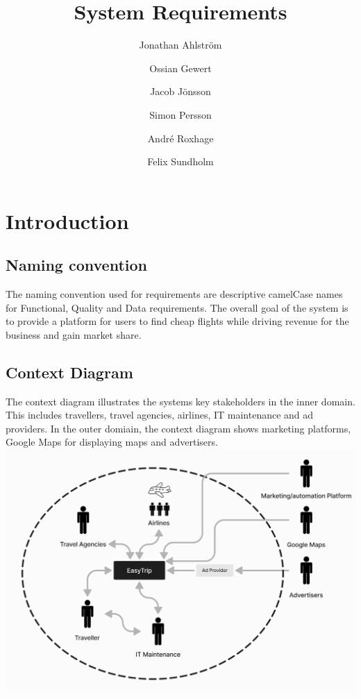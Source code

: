 \documentclass[a4paper]{article}
\title{System Requirements}
\author{Jonathan Ahlström \and Ossian Gewert \and Jacob Jönsson \and Simon Persson \and André Roxhage \and Felix Sundholm}
\begin{document}
\maketitle

\begin{center}
    
\end{center}

\newpage
\tableofcontents
\newpage

\section{Introduction}
\subsection{Naming convention}
The naming convention used for requirements are descriptive camelCase names for Functional, Quality and Data requirements.
The overall goal of the system is to provide a platform for users to find cheap flights while driving revenue for the business and gain market share.

\subsection{Context Diagram}
The context diagram illustrates the systems key stakeholders in the inner domain. This includes travellers, travel agencies, airlines, IT maintenance and ad providers. In the outer domiain, the context diagram shows marketing platforms, Google Maps for displaying maps and advertisers.
\includegraphics[width=.99\textwidth]{resources/contextDiagram.png}
\end{document}
